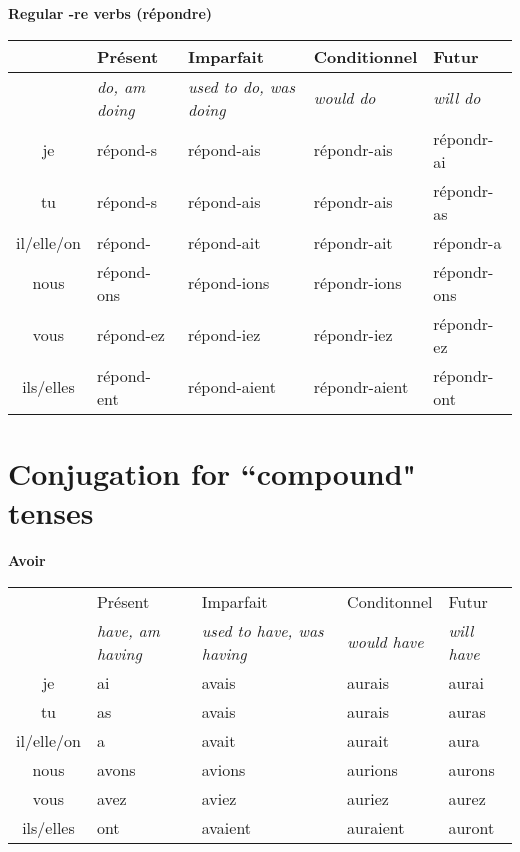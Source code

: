 \vskip 1.5cm
\renewcommand{\stemPresent}{r\'epond}
\renewcommand{\stemFutur}{r\'epondr}
\begin{center}
\textbf{Regular -re verbs (r\'epondre)}
\vskip 0.1cm
\begin{tabular}{|c||L{3cm}|L{3cm}|L{3cm}|L{3cm}|}
\hline
& Pr\'esent & Imparfait & Conditionnel & Futur \\
\hline
& \textit{do, am doing} & \textit{used to do, was doing} & \textit{would do} & \textit{will do} \\
\hline\hline
je           &	\stemPresent-s 	&	\stemPresent-ais	&	\stemFutur-ais	 &	\stemFutur-ai	\\
tu           &	\stemPresent-s	&	\stemPresent-ais	&	\stemFutur-ais	&	\stemFutur-as	\\
il/elle/on &	\stemPresent-	&	\stemPresent-ait	&	\stemFutur-ait	&	\stemFutur-a	\\
nous      &	\stemPresent-ons	&	\stemPresent-ions	&	\stemFutur-ions	&	\stemFutur-ons	\\
vous      &	\stemPresent-ez	&	\stemPresent-iez	&	\stemFutur-iez		&	\stemFutur-ez	\\
ils/elles  &	\stemPresent-ent	&	\stemPresent-aient	&	\stemFutur-aient	&	\stemFutur-ont	\\
\hline
\end{tabular}
\end{center}


\clearpage
\section{Conjugation for ``compound" tenses}
\setcounter{theorem}{0}
\setcounter{equation}{0}

\begin{flushleft}
\textbf{Avoir}
\vskip 0.1cm
\begin{tabular}{|c||L{2.5cm}|L{2.5cm}|L{2.5cm}|L{2.5cm}|}
\hline
& Pr\'esent & Imparfait & Conditonnel & Futur \\
& \textit{have, am having} & \textit{used to have, was having} & \textit{would have} & \textit{will have} \\
\hline\hline
je            &	ai	&	avais	&	aurais	 &	aurai	\\
tu            &	as 	&	avais	&	aurais	&	auras	\\
il/elle/on  &	a	&	avait	&	aurait	&	aura	\\
nous       &	avons	&	avions	&	aurions	&	aurons	\\
vous       &	avez	&	aviez	&	auriez		&	aurez	\\
ils/elles   &	ont 	&	avaient	&	auraient	&	auront	\\
\hline
\end{tabular}
\end{flushleft}

